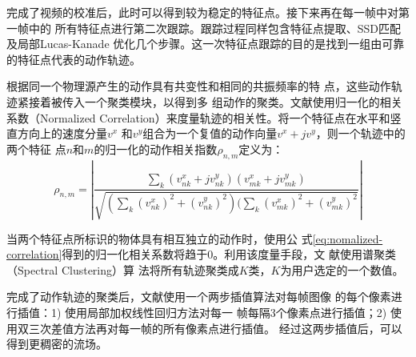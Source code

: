 


完成了视频的校准后，此时可以得到较为稳定的特征点。接下来再在每一帧中对第一帧中的
所有特征点进行第二次跟踪。跟踪过程同样包含特征点提取、SSD匹配及局部Lucas-Kanade
优化几个步骤。这一次特征点跟踪的目的是找到一组由可靠的特征点代表的动作轨迹。

根据同一个物理源产生的动作具有共变性和相同的共振频率的特
点，这些动作轨迹紧接着被传入一个聚类模块，以得到多
组动作的聚类。文献\cite{liu2005motion}使用归一化的相关系数（Normalized
Correlation）来度量轨迹的相关性。将一个特征点在水平和竖直方向上的速度分量$v^x$
和$v^y$组合为一个复值的动作向量$v^x + jv^y$，则一个轨迹中的两个特征
点$n$和$m$的归一化的动作相关指数$\rho_{n,m}$定义为：
\begin{equation}
  \label{eq:nomalized-correlation}
  \rho_{n,m}=\left|\frac{\sum_{k}(v_{nk}^{x}+jv_{nk}^{y})(v_{mk}^{x}+jv_{mk}^{y})}{\sqrt{(\sum_{k}(v_{nk}^x)^2+(v_{nk}^{y})^2)(\sum_{k}(v_{mk}^{x})^2+(v_{mk}^{y})^2}}\right|
\end{equation}

当两个特征点所标识的物体具有相互独立的动作时，使用公
式\ref{eq:nomalized-correlation}得到的归一化相关系数将趋于0。利用该度量手段，文
献\cite{liu2005motion}使用谱聚类（Spectral Clustering）算
法将所有轨迹聚类成$K$类，$K$为用户选定的一个数值。

完成了动作轨迹的聚类后，文献\cite{liu2005motion}使用一个两步插值算法对每帧图像
的每个像素进行插值：1) 使用局部加权线性回归方法对每一
帧每隔3个像素点进行插值；2) 使用双三次差值方法再对每一帧的所有像素点进行插值。
经过这两步插值后，可以得到更稠密的流场。

